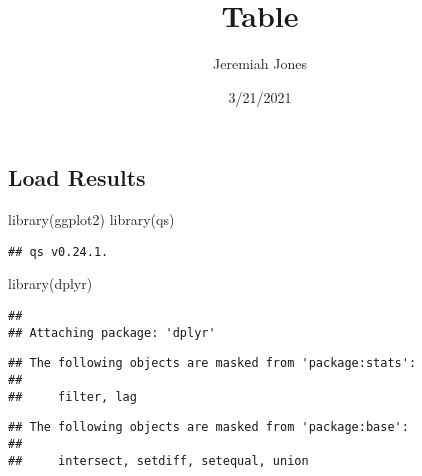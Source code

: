 \documentclass[
]{article}
\title{Table}
\author{Jeremiah Jones}
\date{3/21/2021}
\newenvironment{Shaded}{\begin{snugshade}}{\end{snugshade}}
\newcommand{\FunctionTok}[1]{\textcolor[rgb]{0.00,0.00,0.00}{#1}}
\newcommand{\NormalTok}[1]{#1}
\begin{document}
\maketitle

\hypertarget{load-results}{%
\subsection{Load Results}\label{load-results}}

\begin{Shaded}
\begin{Highlighting}[]
\FunctionTok{library}\NormalTok{(ggplot2)}
\FunctionTok{library}\NormalTok{(qs)}
\end{Highlighting}
\end{Shaded}

\begin{verbatim}
## qs v0.24.1.
\end{verbatim}

\begin{Shaded}
\begin{Highlighting}[]
\FunctionTok{library}\NormalTok{(dplyr)}
\end{Highlighting}
\end{Shaded}

\begin{verbatim}
## 
## Attaching package: 'dplyr'
\end{verbatim}

\begin{verbatim}
## The following objects are masked from 'package:stats':
## 
##     filter, lag
\end{verbatim}

\begin{verbatim}
## The following objects are masked from 'package:base':
## 
##     intersect, setdiff, setequal, union
\end{verbatim}
\end{document}
